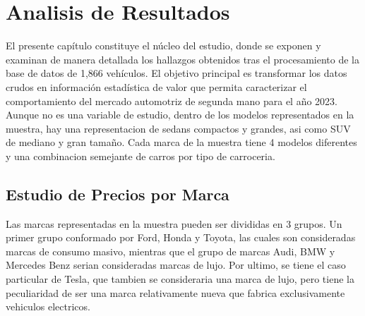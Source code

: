 \documentclass[oneside,11pt]{Latex/Classes/PhDthesisPSnPDF}
\begin{document}
\chapter{Analisis de Resultados}

El presente capítulo constituye el núcleo del estudio, donde se exponen
y examinan de manera detallada los hallazgos obtenidos tras el
procesamiento de la base de datos de 1,866 vehículos. El objetivo
principal es transformar los datos crudos en información estadística de
valor que permita caracterizar el comportamiento del mercado automotriz
de segunda mano para el año 2023. Aunque no es una variable de estudio,
dentro de los modelos representados en la muestra, hay una
representacion de sedans compactos y grandes, asi como SUV de mediano y
gran tamaño. Cada marca de la muestra tiene 4 modelos diferentes y una
combinacion semejante de carros por tipo de carroceria.

\section {Estudio de Precios por Marca}

Las marcas representadas en la muestra pueden ser divididas en 3 grupos.
Un primer grupo conformado por Ford, Honda y Toyota, las cuales son
consideradas marcas de consumo masivo, mientras que el grupo de marcas
Audi, BMW y Mercedes Benz serian consideradas marcas de lujo. Por
ultimo, se tiene el caso particular de Tesla, que tambien se
consideraria una marca de lujo, pero tiene la peculiaridad de ser una
marca relativamente nueva que fabrica exclusivamente vehiculos
electricos.
\end{document}
